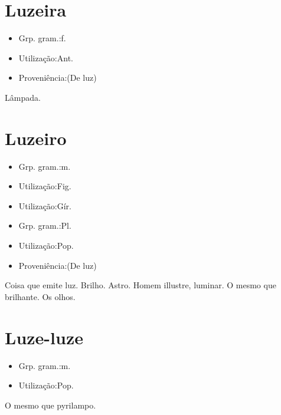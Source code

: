 \section{Luzeira}
\begin{itemize}
\item {Grp. gram.:f.}
\end{itemize}
\begin{itemize}
\item {Utilização:Ant.}
\end{itemize}
\begin{itemize}
\item {Proveniência:(De \textunderscore luz\textunderscore )}
\end{itemize}
Lâmpada.
\section{Luzeiro}
\begin{itemize}
\item {Grp. gram.:m.}
\end{itemize}
\begin{itemize}
\item {Utilização:Fig.}
\end{itemize}
\begin{itemize}
\item {Utilização:Gír.}
\end{itemize}
\begin{itemize}
\item {Grp. gram.:Pl.}
\end{itemize}
\begin{itemize}
\item {Utilização:Pop.}
\end{itemize}
\begin{itemize}
\item {Proveniência:(De \textunderscore luz\textunderscore )}
\end{itemize}
Coisa que emite luz.
Brilho.
Astro.
Homem illustre, luminar.
O mesmo que \textunderscore brilhante\textunderscore .
Os olhos.
\section{Luze-luze}
\begin{itemize}
\item {Grp. gram.:m.}
\end{itemize}
\begin{itemize}
\item {Utilização:Pop.}
\end{itemize}
O mesmo que \textunderscore pyrilampo\textunderscore .
